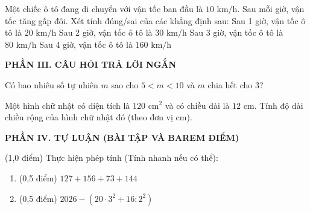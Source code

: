 \documentclass[12pt,a4paper]{article}
\begin{document}
\begin{ex}
Một chiếc ô tô đang di chuyển với vận tốc ban đầu là $10\text{ km/h}$. Sau mỗi giờ, vận tốc tăng gấp đôi. Xét tính đúng/sai của các khẳng định sau:
\choiceTF
{\True Sau 1 giờ, vận tốc ô tô là $20\text{ km/h}$}
{Sau 2 giờ, vận tốc ô tô là $30\text{ km/h}$}
{\True Sau 3 giờ, vận tốc ô tô là $80\text{ km/h}$}
{\True Sau 4 giờ, vận tốc ô tô là $160\text{ km/h}$}
\end{ex}


\setcounter{ex}{0}
\vspace{2mm}
\noindent\textbf{\large PHẦN III. CÂU HỎI TRẢ LỜI NGẮN}
\vspace{1mm}
\begin{ex}
Có bao nhiêu số tự nhiên $m$ sao cho $5 < m < 10$ và $m$ chia hết cho 3? 
\end{ex}

\begin{ex}
Một hình chữ nhật có diện tích là $120\text{ cm}^2$ và có chiều dài là $12\text{ cm}$. Tính độ dài chiều rộng của hình chữ nhật đó (theo đơn vị $\text{cm}$). 
\end{ex}


\setcounter{ex}{0}
\vspace{2mm}
\noindent\textbf{\large PHẦN IV. TỰ LUẬN (BÀI TẬP VÀ BAREM ĐIỂM)}
\vspace{1mm}
\begin{ex} (1,0 điểm)
Thực hiện phép tính (Tính nhanh nếu có thể):
\begin{enumerate}[label=\textbf{\alph*)}, leftmargin=0.8cm, itemsep=2pt]
\item (0,5 điểm) $127 + 156 + 73 + 144$
\item (0,5 điểm) $2026 - (20 \cdot 3^2 + 16 : 2^2)$
\end{enumerate}
\end{ex}
\vspace{2mm}
\end{document}

